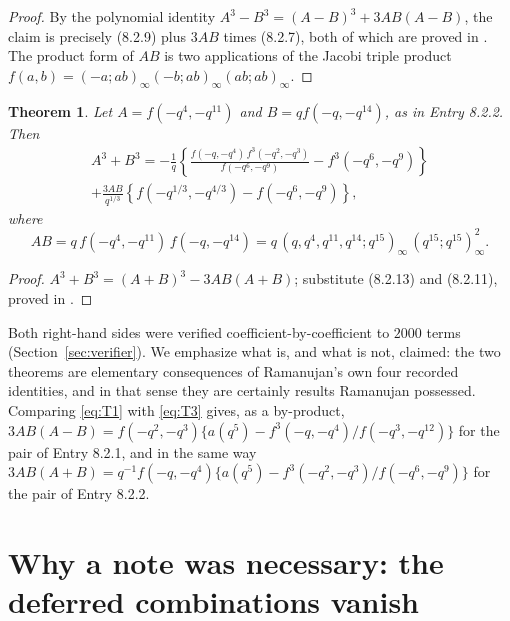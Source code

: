\documentclass[pdflatex,sn-mathphys-num]{sn-jnl}
\theoremstyle{thmstyleone}%
\newtheorem{theorem}{Theorem}%
\theoremstyle{thmstyletwo}%
\newcommand{\f}{f}
\begin{document}
\begin{proof}
By the polynomial identity $A^3-B^3=(A-B)^3+3AB(A-B)$, the claim is precisely
(8.2.9) plus $3AB$ times (8.2.7), both of which are proved in
\cite[pp.~176--177]{AB2}. The product form of $AB$ is two applications of the
Jacobi triple product $\f(a,b)=(-a;ab)_\infty(-b;ab)_\infty(ab;ab)_\infty$.
\end{proof}

\begin{theorem}\label{thm:2}
Let $A=\f(-q^4,-q^{11})$ and $B=q\f(-q,-q^{14})$, as in Entry 8.2.2. Then
\begin{multline}\label{eq:T2}
A^3+B^3=-\frac1q\left\{\frac{\f(-q,-q^4)\,\f^3(-q^2,-q^3)}{\f(-q^6,-q^9)}-\f^3(-q^6,-q^9)\right\}\\
+\frac{3AB}{q^{1/3}}\left\{\f(-q^{1/3},-q^{4/3})-\f(-q^6,-q^9)\right\},
\end{multline}
where
\[
AB=q\,\f(-q^4,-q^{11})\,\f(-q,-q^{14})
=q\,(q,q^4,q^{11},q^{14};q^{15})_\infty\,(q^{15};q^{15})_\infty^2 .
\]
\end{theorem}

\begin{proof}
$A^3+B^3=(A+B)^3-3AB(A+B)$; substitute (8.2.13) and (8.2.11), proved in
\cite[p.~178]{AB2}.
\end{proof}

Both right-hand sides were verified coefficient-by-coefficient to $2000$ terms
(Section~\ref{sec:verifier}). We emphasize what is, and what is not, claimed:
the two theorems are elementary consequences of Ramanujan's own four recorded
identities, and in that sense they are certainly results Ramanujan possessed.
Comparing \eqref{eq:T1} with \eqref{eq:T3} gives, as a by-product,
$3AB(A-B)=\f(-q^2,-q^3)\{a(q^5)-\f^3(-q,-q^4)/\f(-q^3,-q^{12})\}$ for the pair of
Entry 8.2.1, and in the same way $3AB(A+B)=q^{-1}\f(-q,-q^4)\{a(q^5)-\f^3(-q^2,-q^3)/\f(-q^6,-q^9)\}$ for the pair of Entry 8.2.2.

\section{Why a note was necessary: the deferred combinations vanish}\label{sec:nol}
\end{document}
